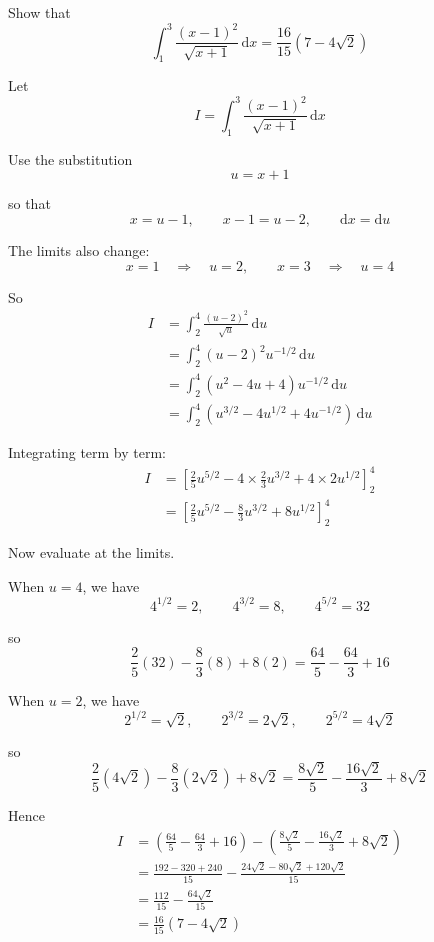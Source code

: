 \documentclass[leqno]{article}
\begin{document}
\djsFrontMatter
\begin{enumerate}[
  label=\textbf{\arabic*.},
  leftmargin=*,
  topsep=0pt,
  partopsep=0pt,
  parsep=0pt
]

\questionitem

Show that
\[
\int_1^3 \frac{(x-1)^2}{\sqrt{x+1}}\,\mathrm{d}x = \frac{16}{15}(7-4\sqrt{2})
\]

\vspace*{10pt}

\begin{djsSolution}
Let
\[
I=\int_1^3 \frac{(x-1)^2}{\sqrt{x+1}}\,\mathrm{d}x
\]

Use the substitution
\[
u=x+1
\]

so that
\[
x=u-1,\qquad x-1=u-2,\qquad \mathrm{d}x=\mathrm{d}u
\]

The limits also change:
\[
x=1\quad\Longrightarrow\quad u=2,\qquad x=3\quad\Longrightarrow\quad u=4
\]

So
\begin{align*}
I&=\int_2^4 \frac{(u-2)^2}{\sqrt{u}}\,\mathrm{d}u \\
&=\int_2^4 (u-2)^2u^{-1/2}\,\mathrm{d}u \\
&=\int_2^4 (u^2-4u+4)u^{-1/2}\,\mathrm{d}u \\
&=\int_2^4 \left(u^{3/2}-4u^{1/2}+4u^{-1/2}\right)\,\mathrm{d}u
\end{align*}

Integrating term by term:
\begin{align*}
I&=\left[\frac{2}{5}u^{5/2}-4\times\frac{2}{3}u^{3/2}+4\times 2u^{1/2}\right]_2^4 \\
&=\left[\frac{2}{5}u^{5/2}-\frac{8}{3}u^{3/2}+8u^{1/2}\right]_2^4
\end{align*}

Now evaluate at the limits.

When $u=4$, we have
\[
4^{1/2}=2,\qquad 4^{3/2}=8,\qquad 4^{5/2}=32
\]

so
\[
\frac{2}{5}(32)-\frac{8}{3}(8)+8(2)=\frac{64}{5}-\frac{64}{3}+16
\]

When $u=2$, we have
\[
2^{1/2}=\sqrt{2},\qquad 2^{3/2}=2\sqrt{2},\qquad 2^{5/2}=4\sqrt{2}
\]

so
\[
\frac{2}{5}(4\sqrt{2})-\frac{8}{3}(2\sqrt{2})+8\sqrt{2}
=\frac{8\sqrt{2}}{5}-\frac{16\sqrt{2}}{3}+8\sqrt{2}
\]

Hence
\begin{align*}
I&=\left(\frac{64}{5}-\frac{64}{3}+16\right)-\left(\frac{8\sqrt{2}}{5}-\frac{16\sqrt{2}}{3}+8\sqrt{2}\right) \\
&=\frac{192-320+240}{15}-\frac{24\sqrt{2}-80\sqrt{2}+120\sqrt{2}}{15} \\
&=\frac{112}{15}-\frac{64\sqrt{2}}{15} \\
&=\frac{16}{15}(7-4\sqrt{2})
\end{align*}


\end{djsSolution}
\end{enumerate}
\end{document}
